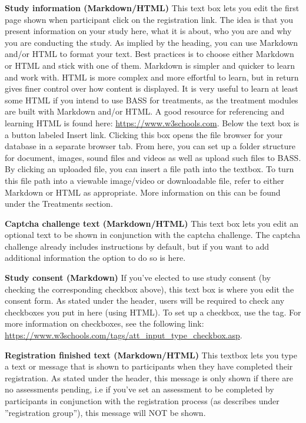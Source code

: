 \documentclass[]{book}
\begin{document}
\textbf{Study information (Markdown/HTML)}
This text box lets you edit the first page shown when participant click on the registration link. The idea is that you present information on your study here, what it is about, who you are and why you are conducting the study.
As implied by the heading, you can use Markdown and/or HTML to format your text. Best practices is to choose either Markdown or HTML and stick with one of them. Markdown is simpler and quicker to learn and work with. HTML is more complex and more effortful to learn, but in return gives finer control over how content is displayed.
It is very useful to learn at least some HTML if you intend to use BASS for treatments, as the treatment modules are built with Markdown and/or HTML.
A good resource for referencing and learning HTML is found here: \url{https://www.w3schools.com}.
Below the text box is a button labeled Insert link. Clicking this box opens the file browser for your database in a separate browser tab. From here, you can set up a folder structure for document, images, sound files and videos as well as upload such files to BASS. By clicking an uploaded file, you can insert a file path into the textbox. To turn this file path into a viewable image/video or downloadable file, refer to either Markdown or HTML as appropriate. More information on this can be found under the Treatments section.

\textbf{Captcha challenge text (Markdown/HTML)}
This text box lets you edit an optional text to be shown in conjunction with the captcha challenge. The captcha challenge already includes instructions by default, but if you want to add additional information the option to do so is here.

\textbf{Study consent (Markdown)}
If you've elected to use study consent (by checking the corresponding checkbox above), this text box is where you edit the consent form. As stated under the header, users will be required to check any checkboxes you put in here (using HTML). To set up a checkbox, use the tag. For more information on checkboxes, see the following link: \url{https://www.w3schools.com/tags/att_input_type_checkbox.asp}.

\textbf{Registration finished text (Markdown/HTML)}
This textbox lets you type a text or message that is shown to participants when they have completed their registration. As stated under the header, this message is only shown if there are no assessments pending, i.e if you've set an assessment to be completed by participants in conjunction with the registration process (as describes under ''registration group''), this message will NOT be shown.
\end{document}

